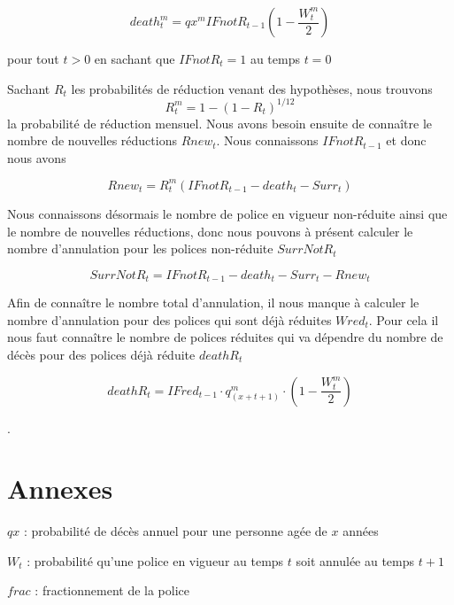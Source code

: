 \documentclass{article}
\begin{document}
\begin{equation}
  death_t^m = qx^m  IFnotR_{t-1} (1-\frac{W^m_{t}}{2})      
\end{equation}

pour tout $t > 0$ en sachant que $IFnotR_t = 1$ au temps $t = 0$


Sachant $R_t$ les probabilités de réduction venant des hypothèses, nous trouvons
\begin{equation}
      R_t^m= 1-(1-R_t)^{1/12}
\end{equation}
la probabilité de réduction mensuel.
Nous avons besoin ensuite de connaître le nombre de nouvelles réductions $Rnew_t$. Nous connaissons  $IFnotR_{t-1}$ et donc nous avons

\begin{equation}
       Rnew_t= R_t^m (IFnotR_{t-1}-death_t-Surr_t)
\end{equation}

Nous connaissons désormais le nombre de police en vigueur non-réduite ainsi que le nombre de nouvelles réductions, donc nous pouvons à présent calculer le nombre d'annulation pour les polices non-réduite $SurrNotR_t$

\begin{equation}
       SurrNotR_t = IFnotR_{t-1}-death_t-Surr_t-Rnew_t
\end{equation}

Afin de connaître le nombre total d'annulation, il nous manque à calculer le nombre d'annulation pour des polices qui sont déjà réduites $Wred_t$. Pour cela il nous faut connaître le nombre de polices réduites qui va dépendre du nombre de décès pour des polices déjà réduite $deathR_t$

\begin{equation}
       deathR_t = IFred_{t-1} \cdot q^m_{(x+t+1)} \cdot (1-\frac{W_t^m}{2})
\end{equation}

\newpage. 
    
\appendix

\section{Annexes}

\noindent $qx$ : probabilité de décès annuel pour une personne agée de $x$ années

\noindent $W_t$ : probabilité qu'une police en vigueur au temps $t$ soit annulée au temps $t+1$

\noindent $frac$ : fractionnement de la police
\end{document}
